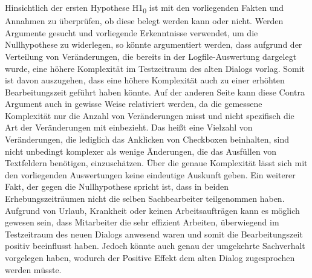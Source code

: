 Hinsichtlich der ersten Hypothese H1\textsubscript{0} ist mit den vorliegenden Fakten und Annahmen zu überprüfen, ob diese belegt werden kann oder nicht. Werden Argumente gesucht und vorliegende Erkenntnisse verwendet, um die Nullhypothese zu widerlegen, so könnte argumentiert werden, dass aufgrund der Verteilung von Veränderungen, die bereits in der Logfile-Auswertung dargelegt wurde, eine höhere Komplexität im Testzeitraum des alten Dialogs vorlag. Somit ist davon auszugehen, dass eine höhere Komplexität auch zu einer erhöhten Bearbeitungszeit geführt haben könnte. Auf der anderen Seite kann diese Contra Argument auch in gewisse Weise relativiert werden, da die gemessene Komplexität nur die Anzahl von Veränderungen misst und nicht spezifisch die Art der Veränderungen mit einbezieht. Das heißt eine Vielzahl von Veränderungen, die lediglich das Anklicken von Checkboxen beinhalten, sind nicht unbedingt komplexer als wenige Änderungen, die das Ausfüllen von Textfeldern benötigen, einzuschätzen. Über die genaue Komplexität lässt sich mit den vorliegenden Auswertungen keine eindeutige Auskunft geben. Ein weiterer Fakt, der gegen die Nullhypothese spricht ist, dass in beiden Erhebungszeiträumen nicht die selben Sachbearbeiter teilgenommen haben. Aufgrund von Urlaub, Krankheit oder keinen Arbeitsaufträgen kann es möglich gewesen sein, dass Mitarbeiter die sehr effizient Arbeiten, überwiegend im Testzeitraum des neuen Dialogs anwesend waren und somit die Bearbeitungszeit positiv beeinflusst haben. Jedoch könnte auch genau der umgekehrte Sachverhalt vorgelegen haben, wodurch der Positive Effekt dem alten Dialog zugesprochen werden müsste.

